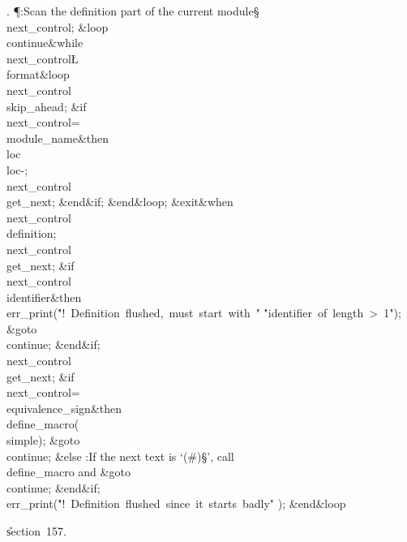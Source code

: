 . \P\?:Scan the definition part of the current module\X\S\?\6
\\{next\_control}\?\K{};\6
\1\&{loop}\6
\4\BL\\{continue}\EL\8\1\&{while}\8\\{next\_control}\?\L\?\\{format}\8\&{loop}\6
\\{next\_control}\?\K\?\\{skip\_ahead};\6
\&{if}\1\1\8\\{next\_control}\?=\?\\{module\_name}\2\8\&{then}\6
\\{loc}\?\K\?\\{loc}\?-;\5
\\{next\_control}\?\K\?\\{get\_next};\2\6
\&{end}\8\2\&{if}\1;\2\6
\&{end}\8\&{loop};\6
\?\&{exit}\8\&{when}\?\8\\{next\_control}\?\I\?\\{definition};\6
\\{next\_control}\?\K\?\\{get\_next};\6
\&{if}\1\1\8\\{next\_control}\?\I\?\\{identifier}\2\8\&{then}\6
\\{err\_print}\?\1(\?\.{"!\ Definition\ flushed,\ must\ start\ with\ "}\?%
\mathbin{\.\&}\?\.{"identifier\ of\ length\ >\ 1"}\?\2)\?;\6
\&{goto}\8\\{continue};\2\6
\&{end}\8\2\&{if}\1;\6
\\{next\_control}\?\K\?\\{get\_next};\6
\&{if}\1\1\8\\{next\_control}\?=\?\\{equivalence\_sign}\2\8\&{then}\6
\\{define\_macro}\?\1(\?\\{simple}\?\2)\?;\5
\&{goto}\8\\{continue};\6
\4\&{else}\6
:If the next text is `\?(\?\#\?)\S\?', call \\{define\_macro} and \&{goto}%
\8\\{continue}\X;\2\6
\&{end}\8\2\&{if}\1;\6
\\{err\_print}\?\1(\?\.{"!\ Definition\ flushed\ since\ it\ starts\ badly"}\?%
\2)\?;\2\6
\&{end}\8\&{loop}\par
\U section~157.\fi

